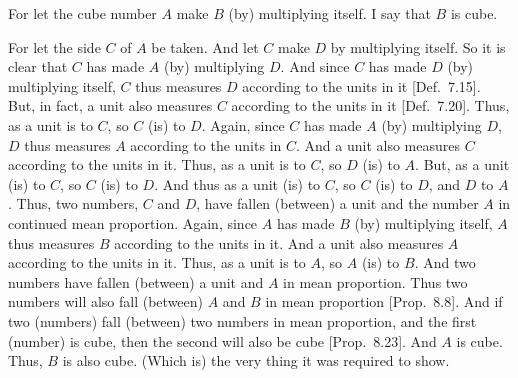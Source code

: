 \begin{Parallel}{}{}
{\epsfysize=1.2in
\centerline{}

For let the cube number $A$ make $B$ (by) multiplying itself. I say
that $B$ is  cube.

For let the side $C$ of $A$ be taken. And let $C$ make
$D$ by multiplying itself. So it is clear that $C$ has made $A$ (by)
multiplying $D$. And since $C$ has made $D$ (by) multiplying itself,
$C$ thus measures $D$ according to the units in it [Def.~7.15]. But, in fact, a unit also measures
$C$ according to the units in it [Def.~7.20]. 
Thus, as a unit is to $C$, so $C$ (is) to $D$. Again, since $C$ has
made $A$ (by) multiplying $D$, $D$ thus measures $A$ according to
the units in $C$. And a unit also measures $C$ according to the units in it. Thus, as a unit is to $C$, so $D$ (is) to $A$. But, as a unit (is) to $C$, so
$C$ (is) to $D$. And thus as a unit (is) to $C$, so $C$ (is) to $D$, and
$D$ to $A$. Thus, two numbers, $C$ and $D$, have fallen (between) a unit
and the number $A$ in continued  mean proportion. Again, since $A$ has made $B$ (by) multiplying itself, $A$ thus measures $B$ according to the units in it.
And a unit also measures $A$ according to the units in it. Thus, as a
unit is to $A$, so $A$ (is) to $B$. And two numbers have
fallen (between) a unit and $A$ in mean proportion. Thus two
numbers will also fall (between) $A$ and $B$ in mean proportion [Prop.~8.8].
And if two
(numbers) fall (between) two numbers in mean proportion, and the
first (number) is cube, then the second will also be  cube 
[Prop.~8.23]. And $A$ is cube.
Thus, $B$ is also  cube. (Which is) the very thing it was required to show.}
\end{Parallel}

